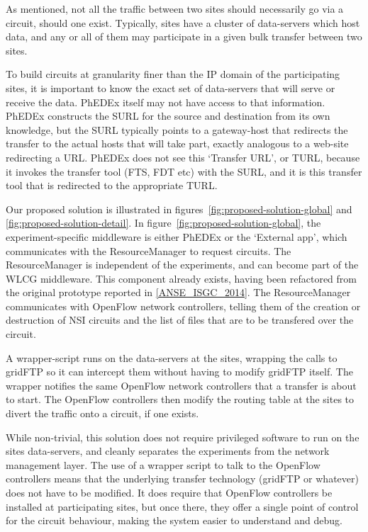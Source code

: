 As mentioned, not all the traffic between two sites should necessarily go via a circuit, should one exist. Typically, sites have a cluster of data-servers which host data, and any or all of them may participate in a given bulk transfer between two sites.

To build circuits at granularity finer than the IP domain of the participating sites, it is important to know the exact set of data-servers that will serve or receive the data. PhEDEx itself may not have access to that information. PhEDEx constructs the SURL for the source and destination from its own knowledge, but the SURL typically points to a gateway-host that redirects the transfer to the actual hosts that will take part, exactly analogous to a web-site redirecting a URL. PhEDEx does not see this `Transfer URL', or TURL, because it invokes the transfer tool (FTS, FDT etc) with the SURL, and it is this transfer tool that is redirected to the appropriate TURL.

Our proposed solution is illustrated in figures~\ref{fig:proposed-solution-global} and \ref{fig:proposed-solution-detail}. In figure~\ref{fig:proposed-solution-global}, the experiment-specific middleware is either PhEDEx or the `External app', which communicates with the ResourceManager to request circuits. The ResourceManager is independent of the experiments, and can become part of the WLCG middleware. This component already exists, having been refactored from the original prototype reported in \ref{ANSE_ISGC_2014}. The ResourceManager communicates with OpenFlow network controllers, telling them of the creation or destruction of NSI circuits and the list of files that are to be transfered over the circuit.

A wrapper-script runs on the data-servers at the sites, wrapping the calls to gridFTP so it can intercept them without having to modify gridFTP itself. The wrapper notifies the same OpenFlow network controllers that a transfer is about to start. The OpenFlow controllers then modify the routing table at the sites to divert the traffic onto a circuit, if one exists.

While non-trivial, this solution does not require privileged software to run on the sites data-servers, and cleanly separates the experiments from the network management layer. The use of a wrapper script to talk to the OpenFlow controllers means that the underlying transfer technology (gridFTP or whatever) does not have to be modified. It does require that OpenFlow controllers be installed at participating sites, but once there, they offer a single point of control for the circuit behaviour, making the system easier to understand and debug.

